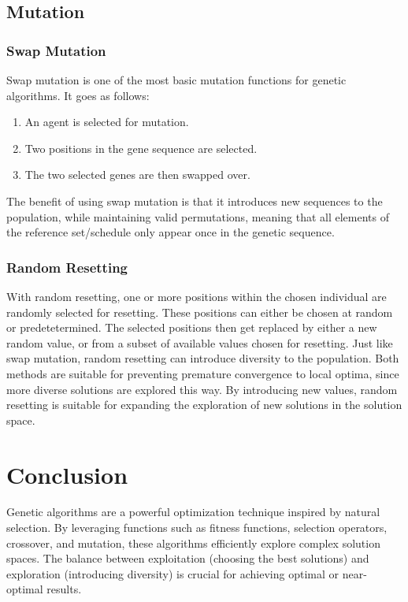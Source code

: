 \documentclass{article}
\begin{document}
\bigskip
\subsection{Mutation}
\bigskip
\subsubsection{Swap Mutation}
Swap mutation is one of the most basic mutation functions for genetic algorithms. It goes as follows:
\begin{enumerate}
  \item An agent is selected for mutation.
  \item Two positions in the gene sequence are selected.
  \item The two selected genes are then swapped over.
\end{enumerate}
\smallskip
The benefit of using swap mutation is that it introduces new sequences to the population, while maintaining valid permutations, meaning that all elements of the reference set/schedule only appear once in the genetic sequence.
\bigskip
\subsubsection{Random Resetting}
With random resetting, one or more positions within the chosen individual are randomly selected for resetting. These positions can either be chosen at random or predetetermined. The selected positions then get replaced by either a new random value, or from a subset of available values chosen for resetting.
\smallskip
Just like swap mutation, random resetting can introduce diversity to the population. Both methods are suitable for preventing premature convergence to local optima, since more diverse solutions are explored this way. By introducing new values, random resetting is suitable for expanding the exploration of new solutions in the solution space.
\newpage
\section{Conclusion}
Genetic algorithms are a powerful optimization technique inspired by natural selection. By leveraging functions such as fitness functions, selection operators, crossover, and mutation, these algorithms efficiently explore complex solution spaces. The balance between exploitation (choosing the best solutions) and exploration (introducing diversity) is crucial for achieving optimal or near-optimal results.
\end{document}
